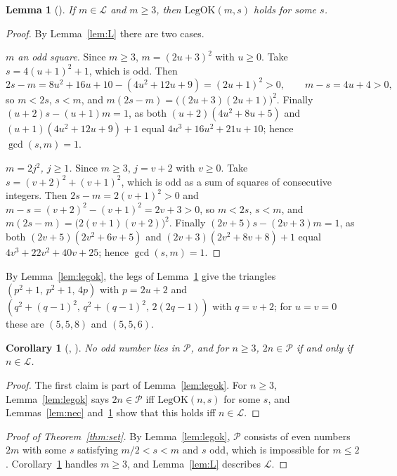 \documentclass[11pt]{amsart}
\theoremstyle{plain}
\newtheorem{lemma}[theorem]{Lemma}
\newtheorem{corollary}[theorem]{Corollary}
\theoremstyle{definition}
\newcommand{\Per}{\mathcal{P}}
\newcommand{\Leg}{\mathcal{L}}
\newcommand{\LegOK}{\mathrm{LegOK}}
\begin{document}
\begin{lemma}[]\label{lem:suff}
If $m\in\Leg$ and $m\ge3$, then $\LegOK(m,s)$ holds for some $s$.
\end{lemma}

\begin{proof}
By Lemma~\ref{lem:L} there are two cases.

\emph{$m$ an odd square.} Since $m\ge3$, $m=(2u+3)^2$ with $u\ge0$. Take $s=4(u+1)^2+1$, which is odd. Then
\[
  2s-m=8u^2+16u+10-(4u^2+12u+9)=(2u+1)^2>0,\qquad m-s=4u+4>0,
\]
so $m<2s$, $s<m$, and $m(2s-m)=\bigl((2u+3)(2u+1)\bigr)^2$. Finally $(u+2)s-(u+1)m=1$, as both $(u+2)(4u^2+8u+5)$ and $(u+1)(4u^2+12u+9)+1$ equal $4u^3+16u^2+21u+10$; hence $\gcd(s,m)=1$.

\emph{$m=2j^2$, $j\ge1$.} Since $m\ge3$, $j=v+2$ with $v\ge0$. Take $s=(v+2)^2+(v+1)^2$, which is odd as a sum of squares of consecutive integers. Then $2s-m=2(v+1)^2>0$ and $m-s=(v+2)^2-(v+1)^2=2v+3>0$, so $m<2s$, $s<m$, and $m(2s-m)=\bigl(2(v+1)(v+2)\bigr)^2$. Finally $(2v+5)s-(2v+3)m=1$, as both $(2v+5)(2v^2+6v+5)$ and $(2v+3)(2v^2+8v+8)+1$ equal $4v^3+22v^2+40v+25$; hence $\gcd(s,m)=1$.
\end{proof}

By Lemma~\ref{lem:legok}, the legs of Lemma~\ref{lem:suff} give the triangles $(p^2+1,\,p^2+1,\,4p)$ with $p=2u+2$ and $(q^2+(q-1)^2,\,q^2+(q-1)^2,\,2(2q-1))$ with $q=v+2$; for $u=v=0$ these are $(5,5,8)$ and $(5,5,6)$.

\begin{corollary}[, ]\label{cor:per}
No odd number lies in $\Per$, and for $n\ge3$, $2n\in\Per$ if and only if $n\in\Leg$.
\end{corollary}

\begin{proof}
The first claim is part of Lemma~\ref{lem:legok}. For $n\ge3$, Lemma~\ref{lem:legok} says $2n\in\Per$ iff $\LegOK(n,s)$ for some $s$, and Lemmas~\ref{lem:nec} and~\ref{lem:suff} show that this holds iff $n\in\Leg$.
\end{proof}

\begin{proof}[Proof of Theorem~\ref{thm:set}]
By Lemma~\ref{lem:legok}, $\Per$ consists of even numbers $2m$ with some $s$ satisfying $m/2<s<m$ and $s$ odd, which is impossible for $m\le2$. Corollary~\ref{cor:per} handles $m\ge3$, and Lemma~\ref{lem:L} describes $\Leg$.
\end{proof}
\end{document}
